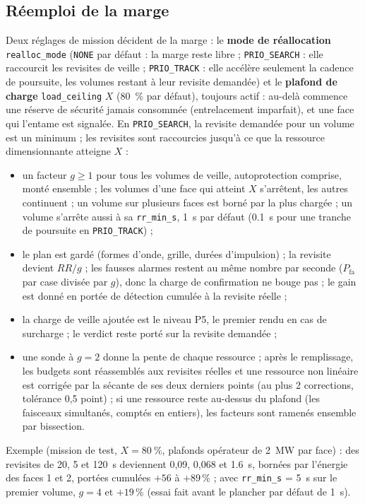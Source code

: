 \documentclass[11pt,a4paper]{article}
\newcommand{\code}[1]{\texttt{\small #1}}
\newcommand{\Pfa}{P_{\mathrm{fa}}}
\begin{document}
\subsection{Réemploi de la marge}
Deux réglages de mission décident de la marge : le \textbf{mode de réallocation} \code{realloc\_mode} (\code{NONE} par
défaut : la marge reste libre ; \code{PRIO\_SEARCH} : elle raccourcit les revisites de veille ; \code{PRIO\_TRACK} : elle
accélère seulement la cadence de poursuite, les volumes restant à leur revisite demandée) et le \textbf{plafond de
charge} \code{load\_ceiling} $X$ (\SI{80}{\percent} par défaut), toujours actif : au-delà commence une réserve de
sécurité jamais consommée (entrelacement imparfait), et une face qui l'entame est signalée. En \code{PRIO\_SEARCH}, la
revisite demandée pour un volume est un minimum ; les revisites sont raccourcies jusqu'à ce que la ressource
dimensionnante atteigne $X$ :
\begin{itemize}
  \item un facteur $g \ge 1$ pour tous les volumes de veille, autoprotection comprise, monté ensemble ; les volumes
        d'une face qui atteint $X$ s'arrêtent, les autres continuent ; un volume sur plusieurs faces est borné par la
        plus chargée ; un volume s'arrête aussi à sa \code{rr\_min\_s}, \SI{1}{s} par défaut (\SI{0.1}{s} pour une
        tranche de poursuite en \code{PRIO\_TRACK}) ;
  \item le plan est gardé (formes d'onde, grille, durées d'impulsion) ; la revisite devient $RR/g$ ; les fausses
        alarmes restent au même nombre par seconde ($\Pfa$ par case divisée par $g$), donc la charge de confirmation ne
        bouge pas ; le gain est donné en portée de détection cumulée à la revisite réelle ;
  \item la charge de veille ajoutée est le niveau P5, le premier rendu en cas de surcharge ; le verdict reste porté sur
        la revisite demandée ;
  \item une sonde à $g = 2$ donne la pente de chaque ressource ; après le remplissage, les budgets sont réassemblés aux
        revisites réelles et une ressource non linéaire est corrigée par la sécante de ses deux derniers points (au plus
        2 corrections, tolérance 0,5 point) ; si une ressource reste au-dessus du plafond (les faisceaux simultanés,
        comptés en entiers), les facteurs sont ramenés ensemble par bissection.
\end{itemize}
Exemple (mission de test, $X = \SI{80}{\percent}$, plafonds opérateur de \SI{2}{MW} par face) : des revisites de 20,
5 et \SI{120}{s} deviennent 0,09, 0,068 et \SI{1.6}{s}, bornées par l'énergie des faces 1 et 2, portées cumulées
$+56$ à $+89\,\%$ ; avec \code{rr\_min\_s} = \SI{5}{s} sur le premier volume, $g = 4$ et $+19\,\%$ (essai fait avant
le plancher par défaut de \SI{1}{s}).
\end{document}

